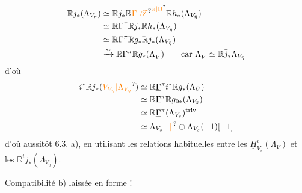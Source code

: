 \[
\begin{aligned}
\mathbb{R}j_*(\Lambda_{V_\eta})&\simeq\mathbb{R}j_*\mathbb{R}{\unsure{\Gamma|\mathscr{T}}}^{\unsure{\pi|\Pi}}\mathbb{R}h_*(\Lambda_{V_{\bar\eta}})\\
&\simeq\mathbb{R}\Gamma^\pi\mathbb{R}j_*\mathbb{R}h_*(\Lambda_{V_{\bar\eta}})\\
&\simeq\mathbb{R}\Gamma^\pi\mathbb{R}g_*\mathbb{R}\bar j_*(\Lambda_{V_{\bar\eta}})\\
&\xrightarrow{\sim}\mathbb{R}\Gamma^\pi\mathbb{R}g_*(\Lambda_{\bar V})\qquad\text{car }\Lambda_{\bar V}\simeq\mathbb{R}\bar j_*\Lambda_{V_{\bar\eta}}
\end{aligned}
\]
d'où
\[
\begin{aligned}
i^*\mathbb{R}j_*(\unsure{V_{V_\eta}|\Lambda_{V_\eta}})&\simeq\mathbb{R}\underline\Gamma^\pi i^*\mathbb{R}g_*(\Lambda_{\bar V})\\
&\simeq\mathbb{R}\underline\Gamma^\pi\mathbb{R}g_{0*}(\Lambda_{V_{\bar s}})\\
&\simeq\mathbb{R}\underline\Gamma^\pi(\Lambda_{V_s})^{\mathrm{triv}}\\
&\simeq\Lambda_{V_s}\unsure{-|\,}\oplus\Lambda_{V_s}(-1)[-1]
\end{aligned}
\]
d'où aussitôt 6.3. a), en utilisant les relations habituelles entre les $\underline H^i_{V_s}(\Lambda_V)$ et les $\mathbb{R}^ij_*(\Lambda_{V_\eta})$.

Compatibilité b) laissée  en forme !

